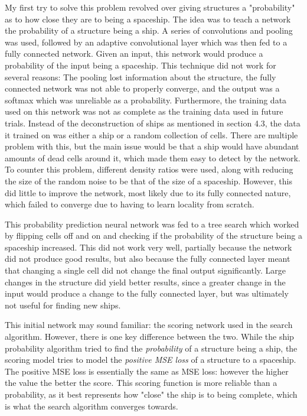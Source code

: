 \documentclass{l4proj}
\begin{document}
My first try to solve this problem revolved over giving structures a "probability" as to how close they are to being a spaceship. The idea was to teach a network the probability of a structure being a ship. A series of convolutions and pooling was used, followed by an adaptive convolutional layer which was then fed to a fully connected network. Given an input, this network would produce a probability of the input being a spaceship. This technique did not work for several reasons: The pooling lost information about the structure, the fully connected network was not able to properly converge, and the output was a softmax which was unreliable as a probability. Furthermore, the training data used on this network was not as complete as the training data used in future trials. Instead of the deconstruction of ships as mentioned in section 4.3, the data it trained on was either a ship or a random collection of cells. There are multiple problem with this, but the main issue would be that a ship would have abundant amounts of dead cells around it, which made them easy to detect by the network. To counter this problem, different density ratios were used, along with reducing the size of the random noise to be that of the size of a spaceship. However, this did little to improve the network, most likely due to its fully connected nature, which failed to converge due to having to learn locality from scratch.

This probability prediction neural network was fed to a tree search which worked by flipping cells off and on and checking if the probability of the structure being a spaceship increased. This did not work very well, partially because the network did not produce good results, but also because the fully connected layer meant that changing a single cell did not change the final output significantly. Large changes in the structure did yield better results, since a greater change in the input would produce a change to the fully connected layer, but was ultimately not useful for finding new ships. 

This initial network may sound familiar: the scoring network used in the search algorithm. However, there is one key difference between the two. While the ship probability algorithm tried to find the \emph{probability} of a structure being a ship, the scoring model tries to model the \emph{positive MSE loss} of a structure to a spaceship. The positive MSE loss is essentially the same as MSE loss: however the higher the value the better the score. This scoring function is more reliable than a probability, as it best represents how "close" the ship is to being complete, which is what the search algorithm converges towards.
\end{document}
